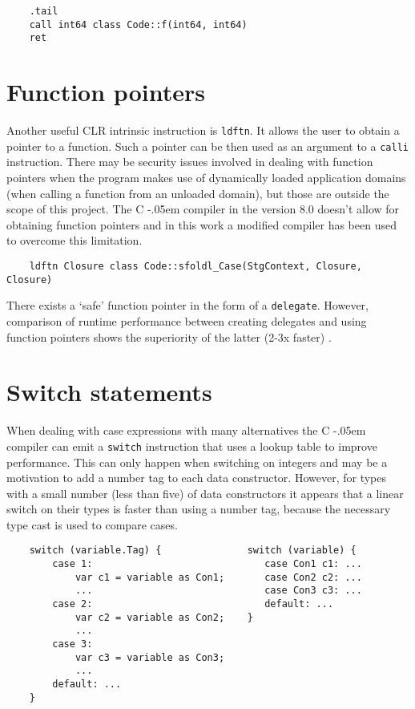 \documentclass[en]{pracamgr}
\newcommand{\shrp}{%
  {\settoheight{\dimen0}{C}\kern-.05em \resizebox{!}{\dimen0}{\raisebox{\depth}{\textbf{\#}}}\hspace{1ex}}}
\begin{document}
\begin{verbatim}
    .tail
    call int64 class Code::f(int64, int64)
    ret
\end{verbatim}

\section{Function pointers}\label{ldftn}

Another useful CLR intrinsic instruction is \texttt{ldftn}.
It allows the user to obtain a pointer to a function.
Such a pointer can be then used as an argument to a
 \texttt{calli} instruction.
There may be security issues involved in dealing with function
pointers when the program makes use of dynamically loaded application
domains (when calling a function from an unloaded domain), but
those are outside the scope of this project.
The C\shrp compiler in the version 8.0 doesn't allow for obtaining
function pointers and in this work a modified compiler has been used
to overcome this limitation.

\begin{verbatim}
    ldftn Closure class Code::sfoldl_Case(StgContext, Closure, Closure)
\end{verbatim}

There exists a `safe' function pointer in the form of a \texttt{delegate}.
However, comparison of runtime performance between creating delegates and
using function pointers shows the superiority of the latter (2-3x faster)
\cite{ldftnVSdelegate}.

\section{Switch statements}

When dealing with case expressions with many alternatives the C\shrp compiler
can emit a \texttt{switch} instruction that uses a lookup table to improve
performance. This can only happen when switching on integers and may be
a motivation to add a number tag to each data constructor.
However, for types with a small number (less than five) of
data constructors it appears that a linear switch on their types is faster
than using a number tag, because the necessary type cast is used
to compare cases.

\begin{verbatim}
    switch (variable.Tag) {               switch (variable) {
        case 1:                              case Con1 c1: ...
            var c1 = variable as Con1;       case Con2 c2: ...
            ...                              case Con3 c3: ...
        case 2:                              default: ...
            var c2 = variable as Con2;    }
            ...
        case 3: 
            var c3 = variable as Con3;
            ...
        default: ...
    }
\end{verbatim}
\end{document}
